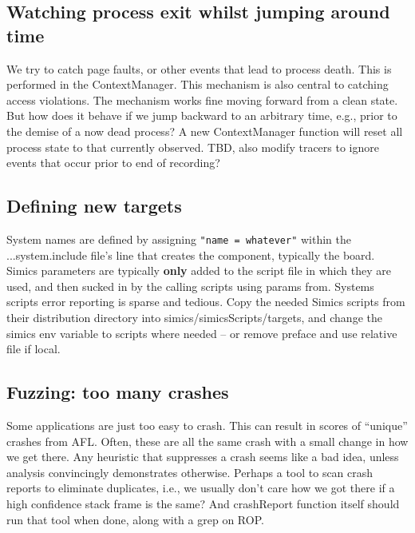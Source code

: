 \documentclass[titlepage]{article}
\begin{document}
\begin{appendices}

\subsection{Watching process exit whilst jumping around time}
We try to catch page faults, or other events that lead to process death.  This is performed in the ContextManager.  
This mechanism is also central to catching access violations.  The mechanism works fine moving forward from a clean state.  But
how does it behave if we jump backward to an arbitrary time, e.g., prior to the demise of a now dead process?  A new ContextManager function
will reset all process state to that currently observed.  TBD, also modify tracers to ignore events that occur prior to end of recording?

\subsection{Defining new targets}
System names are defined by assigning {\tt "name = whatever"} within the ...system.include file's line that creates the component, typically the board.
Simics parameters are typically \textbf{only} added to the script file in which they are used, and then sucked in by the calling scripts using params from.
Systems scripts error reporting is sparse and tedious.   Copy the needed Simics scripts from their distribution directory into simics/simicsScripts/targets,
and change the simics env variable to scripts where needed -- or remove preface and use relative file if local. 

\subsection{Fuzzing: too many crashes}
Some applications are just too easy to crash.  This can result in scores of ``unique'' crashes from AFL.  Often, these are all the same
crash with a small change in how we get there.  Any heuristic that suppresses a crash seems like a bad idea, unless analysis convincingly demonstrates otherwise.
Perhaps a tool to scan crash reports to eliminate duplicates, i.e., we usually don't care how we got there if a high confidence stack frame is the same?
And crashReport function itself should run that tool when done, along with a grep on ROP.


\end{appendices}
\end{document}
